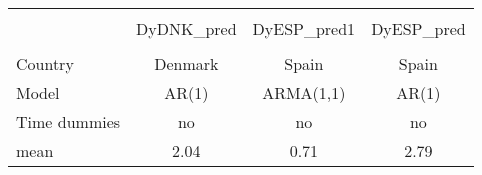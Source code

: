 \begin{tabular}{lccc}\toprule
            &\multicolumn{3}{c}{}                  \\
            &  DyDNK\_pred& DyESP\_pred1&  DyESP\_pred\\
\midrule\\ Country&Denmark&Spain&Spain\\ Model&AR(1)&ARMA(1,1)&AR(1)\\ Time dummies&no&no&no\\ \midrule
mean        &        2.04&        0.71&        2.79\\
\bottomrule \end{tabular}
